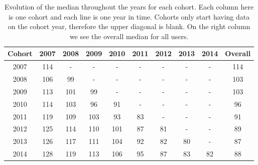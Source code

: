 \begin{table}[htbp]
\centering
\tabcolsep=0.11cm
\singlespacing
\fontsize{7pt}{8pt}\selectfont
\begin{tabular}{|c|c|c|c|c|c|c|c|c|c|}
\hline
Cohort & 2007 & 2008 & 2009 & 2010 & 2011 & 2012 & 2013 & 2014 & Overall\\ \hline
2007 & 114 & - & - & - & - & - & - & - & 114 \\ \hline
2008 & 106 & 99 & - & - & - & - & - & - & 103 \\ \hline
2009 & 113 & 101 & 99 & - & - & - & - & - & 103 \\ \hline
2010 & 114 & 103 & 96 & 91 & - & - & - & - & 96 \\ \hline
2011 & 119 & 109 & 103 & 93 & 83 & - & - & - & 91 \\ \hline
2012 & 125 & 114 & 110 & 101 & 87 & 81 & - & - & 89 \\ \hline
2013 & 126 & 117 & 111 & 104 & 92 & 82 & 80 & - & 87 \\ \hline
2014 & 128 & 119 & 113 & 106 & 95 & 87 & 83 & 82 & 88 \\ \hline
\end{tabular}
\caption{Evolution of the median throughout the years for each cohort. Each column here is one cohort and each line is one year in time. Cohorts only start having data on the cohort year, therefore the upper diagonal is blank. On the right column we see the overall median for all users.}
\label{tab:simpson}
\end{table}



